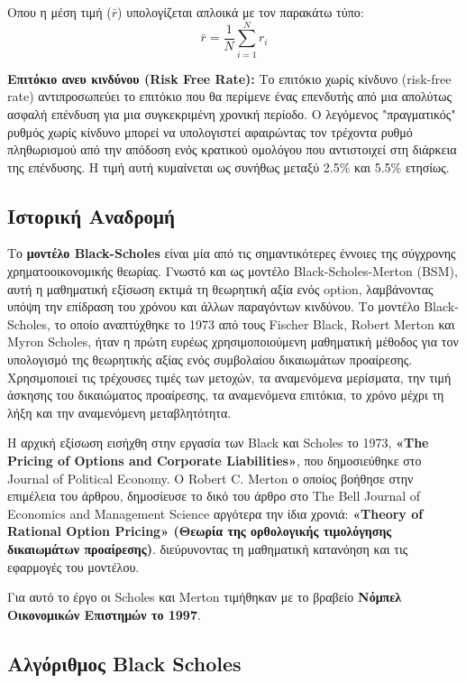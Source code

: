 Οπου η μέση τιμή ($\bar{r}$) υπολογίζεται απλοικά με τον παρακάτω τύπο:
\begin{equation}
    \bar{r} = \frac{1}{N} \sum_{i=1}^{N} r_i
\end{equation}

\textbf{Eπιτόκιο ανευ κινδύνου (Risk Free Rate):}
Το επιτόκιο χωρίς κίνδυνο (risk-free rate) αντιπροσωπεύει το επιτόκιο που θα περίμενε ένας επενδυτής από μια απολύτως ασφαλή επένδυση για μια συγκεκριμένη χρονική περίοδο.
Ο λεγόμενος "πραγματικός" ρυθμός χωρίς κίνδυνο μπορεί να υπολογιστεί αφαιρώντας τον τρέχοντα ρυθμό πληθωρισμού από την απόδοση ενός κρατικού ομολόγου που αντιστοιχεί στη διάρκεια της επένδυσης.
Η τιμή αυτή κυμαίνεται ως συνήθως μεταξύ 2.5\% και 5.5\% ετησίως.

\subsection{Ιστορική Αναδρομή}
Το \textbf{μοντέλο Black-Scholes} είναι μία από τις σημαντικότερες έννοιες της σύγχρονης χρηματοοικονομικής θεωρίας.
Γνωστό και ως μοντέλο Black-Scholes-Merton (BSM), αυτή η μαθηματική εξίσωση εκτιμά τη θεωρητική αξία ενός option, λαμβάνοντας υπόψη την επίδραση του χρόνου και άλλων παραγόντων κινδύνου.
Το μοντέλο Black-Scholes, το οποίο αναπτύχθηκε το 1973 από τους Fischer Black, Robert Merton και Myron Scholes, 
ήταν η πρώτη ευρέως χρησιμοποιούμενη μαθηματική μέθοδος για τον υπολογισμό της θεωρητικής αξίας ενός συμβολαίου δικαιωμάτων προαίρεσης.
Χρησιμοποιεί τις τρέχουσες τιμές των μετοχών, τα αναμενόμενα μερίσματα, την τιμή άσκησης του δικαιώματος προαίρεσης, τα αναμενόμενα επιτόκια, το χρόνο μέχρι τη λήξη και την αναμενόμενη μεταβλητότητα.

Η αρχική εξίσωση εισήχθη στην εργασία των Black και Scholes το 1973, \textbf{«The Pricing of Options and Corporate Liabilities»}, που δημοσιεύθηκε στο Journal of Political Economy.
Ο Robert C. Merton ο οποίος βοήθησε στην επιμέλεια του άρθρου, δημοσίευσε το δικό του άρθρο στο The Bell Journal of Economics and Management Science αργότερα την ίδια χρονιά:
\textbf{«Theory of Rational Option Pricing» (Θεωρία της ορθολογικής τιμολόγησης δικαιωμάτων προαίρεσης)}.
διεύρυνοντας τη μαθηματική κατανόηση και τις εφαρμογές του μοντέλου.

Για αυτό το έργο οι Scholes και Merton τιμήθηκαν με το βραβείο \textbf{Νόμπελ Οικονομικών Επιστημών το 1997}.

\subsection{Αλγόριθμος Black Scholes}

